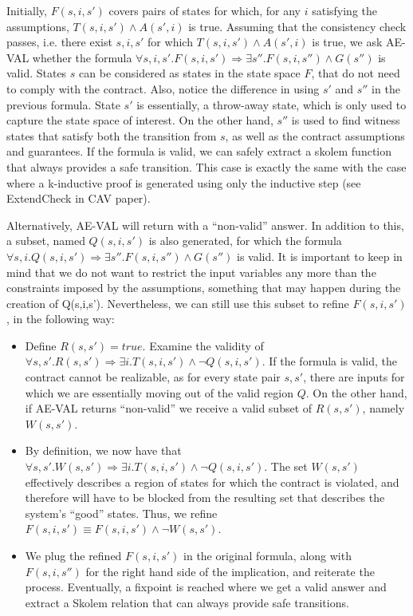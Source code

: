 \documentclass{article}
\begin{document}
Initially, $F(s, i, s')$ covers pairs of states for which, for any $i$
satisfying the assumptions, $T(s,i,s') \land A(s',i)$ is true. Assuming that the
consistency check passes, i.e. there exist $s, i ,s'$ for which $T(s,i,s') \land
A(s',i)$ is true, we ask AE-VAL whether the formula $\forall s,i,s'. F(s,i,s') \Rightarrow \exists s''.
F(s,i,s'') \land G(s'')$ is valid. States $s$ can be considered as
states in the state space $F$, that do not need to comply with the contract.
Also, notice the difference in using $s'$ and $s''$ in the previous formula. State $s'$ is essentially, a throw-away state, which is only used to
capture the state space of interest. On the other hand, $s''$ is used to find
witness states that satisfy both the transition from $s$, as well as the
contract assumptions and guarantees. If the formula is valid, we can safely
extract a skolem function that always provides a safe transition. This case is
exactly the same with the case where a k-inductive proof is generated using only the inductive step (see ExtendCheck in CAV paper).

Alternatively, AE-VAL will return with a ``non-valid'' answer. In addition to
this, a subset, named $Q(s,i,s')$ is also generated, for which the formula
$\forall s,i. Q(s,i,s') \Rightarrow \exists s''. F(s,i,s'') \land G(s'')$ is
valid. It is important to keep in mind that we do not want to restrict the input
variables any more than the constraints imposed by the assumptions, something
that may happen during the creation of Q(s,i,s'). Nevertheless, we can still use
this subset to refine $F(s,i,s')$, in the following way:

\begin{itemize}
  \item Define $R(s,s') = true$. Examine the validity of $\forall s,s'. R(s,s')
  \Rightarrow \exists i. T(s,i,s') \land \lnot Q(s,i,s')$. If the formula is
  valid, the contract cannot be realizable, as for every state pair $s, s'$,
  there are inputs for which we are essentially moving out of the valid region
  $Q$. On the other hand, if AE-VAL returns ``non-valid'' we receive a valid
  subset of $R(s,s')$, namely $W(s,s')$.
  \item By definition, we now have that $\forall s,s'. W(s,s') \Rightarrow
  \exists i. T(s,i,s') \land \lnot Q(s,i,s')$. The set $W(s,s')$ effectively
  describes a region of states for which the contract is violated, and therefore will have to be blocked from the
  resulting set that describes the system's ``good'' states. Thus, we refine
  $F(s,i,s') \equiv F(s,i,s') \land \lnot W(s,s')$.
  \item We plug the refined $F(s,i,s')$ in the original formula, along with
  $F(s,i,s'')$ for the right hand side of the implication, and reiterate the
  process. Eventually, a fixpoint is reached where we get a valid answer and
  extract a Skolem relation that can always provide safe transitions.
\end{itemize}
\end{document}
